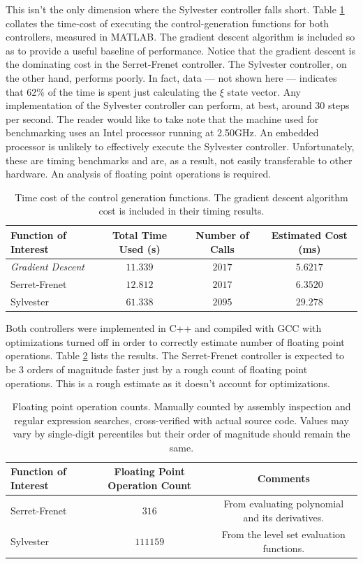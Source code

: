 \documentclass[oneside, 11pt]{book}
\begin{document}
This isn't the only dimension where the Sylvester controller falls short. Table \ref{tab:perf_simple} collates the time-cost of executing the control-generation functions for both controllers, measured in MATLAB. The gradient descent algorithm is included so as to provide a useful baseline of performance. Notice that the gradient descent is the dominating cost in the Serret-Frenet controller. The Sylvester controller, on the other hand, performs poorly. In fact, data --- not shown here --- indicates that 62\% of the time is spent just calculating the $\xi$ state vector. Any implementation of the Sylvester controller can perform, at best, around 30 steps per second. The reader would like to take note that the machine used for benchmarking uses an Intel processor running at 2.50GHz. An embedded processor is unlikely to effectively execute the Sylvester controller. Unfortunately, these are timing benchmarks and are, as a result, not easily transferable to other hardware. An analysis of floating point operations is required.
\begin{table}[!htbp]
    \centering
    \begin{tabular}{l|c|c|c}
        Function of Interest & Total Time Used (s) & Number of Calls & Estimated Cost (ms) \\ \hline
        \emph{Gradient Descent} & $11.339$ & $2017$ & $5.6217$\\ \hline
        Serret-Frenet & $12.812$ & $2017$ & $6.3520$ \\ \hline
        Sylvester & $61.338$ & $2095$ & $29.278$
    \end{tabular}
    \caption{Time cost of the control generation functions. The gradient descent algorithm cost is included in their timing results.}
    \label{tab:perf_simple}
\end{table}

Both controllers were implemented in C++ and compiled with GCC with optimizations turned off in order to correctly estimate number of floating point operations. Table \ref{tab:perf_flop} lists the results. The Serret-Frenet controller is expected to be 3 orders of magnitude faster just by a rough count of floating point operations. This is a rough estimate as it doesn't account for optimizations.

\begin{table}[!htbp]
    \centering
    \begin{tabular}{l|c|c}
        Function of Interest & Floating Point Operation Count & Comments\\ \hline
        Serret-Frenet & $316$ & From evaluating polynomial and its derivatives.\\  \hline
        Sylvester & $111159$ & From the level set evaluation functions.
    \end{tabular}
    \caption{Floating point operation counts. Manually counted by assembly inspection and regular expression searches, cross-verified with actual source code. Values may vary by single-digit percentiles but their order of magnitude should remain the same.}
    \label{tab:perf_flop}
\end{table}
\end{document}
